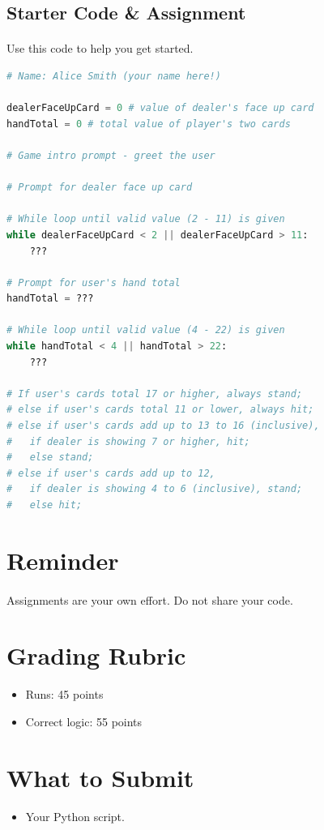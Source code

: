 \documentclass[letter,10pt]{article}
\begin{document}
    \subsection*{Starter Code \& Assignment}
    \paragraph{}Use this code to help you get started.
    \begin{lstlisting}[language=python]
# Name: Alice Smith (your name here!)

dealerFaceUpCard = 0 # value of dealer's face up card
handTotal = 0 # total value of player's two cards

# Game intro prompt - greet the user

# Prompt for dealer face up card

# While loop until valid value (2 - 11) is given
while dealerFaceUpCard < 2 || dealerFaceUpCard > 11:
    ???

# Prompt for user's hand total
handTotal = ???

# While loop until valid value (4 - 22) is given
while handTotal < 4 || handTotal > 22:
    ???

# If user's cards total 17 or higher, always stand;
# else if user's cards total 11 or lower, always hit;
# else if user's cards add up to 13 to 16 (inclusive),
#   if dealer is showing 7 or higher, hit;
#   else stand;
# else if user's cards add up to 12,
#   if dealer is showing 4 to 6 (inclusive), stand;
#   else hit;
    \end{lstlisting}

    \section*{Reminder}
    \paragraph{}Assignments are your own effort. Do not share your code.
    
    \section*{Grading Rubric}
    \begin{itemize}
        \item Runs: 45 points
        \item Correct logic: 55 points
    \end{itemize}
    
   \section*{What to Submit}
   \begin{itemize}
       \item Your Python script.
   \end{itemize}
\end{document}
